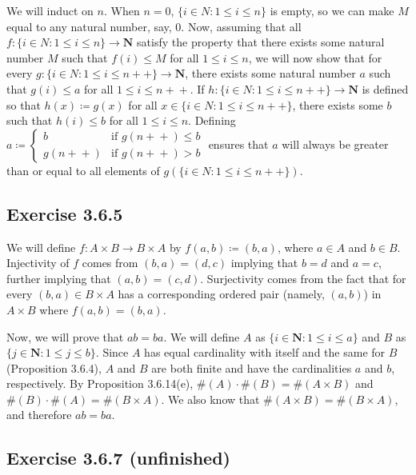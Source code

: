 \documentclass[12pt, oneside]{book}
\newcommand{\increment}{\! + \! +}
\begin{document}
	We will induct on $n$. When $n = 0$, $\{i \in N: 1 \le i \le n\}$ is empty, so we can make $M$ equal to any natural number, say, $0$. Now, assuming that all $f \colon \{i \in N: 1 \le i \le n\} \rightarrow \mathbf{N}$ satisfy the property that there exists some natural number $M$ such that $f(i) \le M$ for all $1 \le i \le n$, we will now show that for every $g \colon \{i \in N: 1 \le i \le n \increment\} \rightarrow \mathbf{N}$, there exists some natural number $a$ such that $g(i) \le a$ for all $1 \le i \le n \increment$. If $h \colon \{i \in N: 1 \le i \le n \increment\} \rightarrow \mathbf{N}$ is defined so that $h(x) \coloneqq g(x)$ for all $x \in \{i \in N: 1 \le i \le n \increment\}$, there exists some $b$ such that $h(i) \le b$ for all $1 \le i \le n$. Defining $a \coloneqq \begin{cases}
		b & \text{if } g(n \increment) \le b \\
		g(n \increment) & \text{if } g(n \increment) > b
	\end{cases}$ ensures that $a$ will always be greater than or equal to all elements of $g(\{i \in N: 1 \le i \le n \increment\})$.

	\subsection*{Exercise 3.6.5}

	We will define $f \colon A \times B \rightarrow B \times A$ by $f(a, b) \coloneqq (b, a)$, where $a \in A$ and $b \in B$. Injectivity of $f$ comes from $(b, a) = (d, c)$ implying that $b = d$ and $a = c$, further implying that $(a, b) = (c, d)$. Surjectivity comes from the fact that for every $(b, a) \in B \times A$ has a corresponding ordered pair (namely, $(a, b)$) in $A \times B$ where $f(a, b) = (b, a)$.

	Now, we will prove that $ab = ba$. We will define $A$ as $\{i \in \mathbf{N}: 1 \le i \le a\}$ and $B$ as $\{j \in \mathbf{N}: 1 \le j \le b\}$. Since $A$ has equal cardinality with itself and the same for $B$ (Proposition 3.6.4), $A$ and $B$ are both finite and have the cardinalities $a$ and $b$, respectively. By Proposition 3.6.14(e), $\#(A) \cdot \#(B) = \#(A \times B)$ and $\#(B) \cdot \#(A) = \#(B \times A)$. We also know that $\#(A \times B) = \#(B \times A)$, and therefore $ab = ba$.

	\subsection*{Exercise 3.6.7 (unfinished)}
\end{document}
